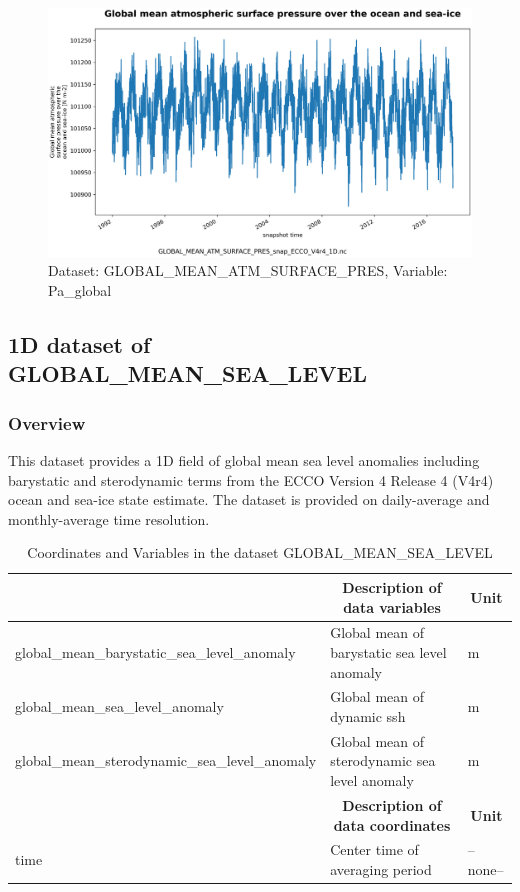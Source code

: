 \begin{figure}[H]
\centering
\includegraphics[scale=0.55]{../images/plots/oneD_plots/Global_Mean_Atmospheric_Pressure/Pa_global.png}
\caption{Dataset: GLOBAL\_MEAN\_ATM\_SURFACE\_PRES, Variable: Pa\_global}
\label{tab:table-GLOBAL_MEAN_ATM_SURFACE_PRES_Pa_global-Plot}
\end{figure}
\subsection{1D dataset of GLOBAL\_MEAN\_SEA\_LEVEL}
\newp
\subsubsection{Overview}
This dataset provides a 1D field of global mean sea level anomalies including barystatic and sterodynamic terms from the ECCO Version 4 Release 4 (V4r4) ocean and sea-ice state estimate. The dataset is provided on daily-average and monthly-average time resolution. 
\begin{longtable}{|m{}|m{}|m{}|}
\caption{Coordinates and Variables in the dataset GLOBAL\_MEAN\_SEA\_LEVEL}
\label{tab:table-GLOBAL_MEAN_SEA_LEVEL-fields} \\ 
\hline \endhead \hline \endfoot
\rowcolor{lightgray} \multicolumn{1}{|c|}{\textbf{Variables}} & \multicolumn{1}{|c|}{\textbf{Description of data variables}} &  \multicolumn{1}{|c|}{\textbf{Unit}}\\ \hline
global\_mean\_barystatic\_sea\_level\_anomaly &Global mean of barystatic sea level anomaly &m  \\ \hline
global\_mean\_sea\_level\_anomaly &Global mean of dynamic ssh &m  \\ \hline
global\_mean\_sterodynamic\_sea\_level\_anomaly &Global mean of sterodynamic sea level anomaly &m  \\ \hline
\rowcolor{lightgray} \multicolumn{1}{|c|}{\textbf{Coordinates}} & \multicolumn{1}{|c|}{\textbf{Description of data coordinates}} &  \multicolumn{1}{|c|}{\textbf{Unit}}\\ \hline
time &Center time of averaging period &--none--  \\ \hline
\end{longtable}

